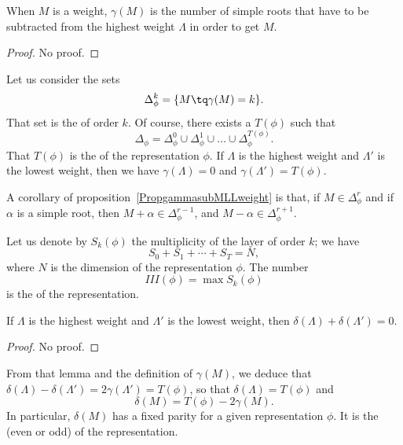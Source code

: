 \begin{proposition}     \label{PropgammasubMLLweight}
When $M$ is a weight, $\gamma(M)$ is the number of simple roots that have to be subtracted from the highest weight $\Lambda$ in order to get $M$.
\end{proposition}
\begin{proof}
    No proof.
\end{proof}

Let us consider the sets
\begin{equation}
    \Delta_{\phi}^k=\{ M\tq\gamma(M)=k \}.
\end{equation}
That set is the  of order $k$. Of course, there exists a $T(\phi)$ such that
\begin{equation}
    \Delta_{\phi}=\Delta_{\phi}^0\cup\Delta_{\phi}^1\cup\ldots\cup\Delta_{\phi}^{T(\phi)}.
\end{equation}
That $T(\phi)$ is the  of the representation $\phi$. If $\Lambda$ is the highest weight and $\Lambda'$ is the lowest weight, then we have $\gamma(\Lambda)=0$ and $\gamma(\Lambda')=T(\phi)$.

A corollary of proposition~\ref{PropgammasubMLLweight} is that, if $M\in\Delta_{\phi}^r$ and if $\alpha$ is a simple root, then $M+\alpha\in\Delta_{\phi}^{r-1}$, and $M-\alpha\in\Delta_{\phi}^{r+1}$.

Let us denote by $S_k(\phi)$ the multiplicity of the layer of order $k$; we have
\begin{equation}
    S_0+S_1+\cdots+S_T=N,
\end{equation}
where $N$ is the dimension of the representation $\phi$. The number
\begin{equation}
    III(\phi)=\max S_k(\phi)
\end{equation}
is the  of the representation.

\begin{lemma}
    If $\Lambda$ is the highest weight and $\Lambda'$ is the lowest weight, then $\delta(\Lambda)+\delta(\Lambda')=0$.
\end{lemma}
\begin{proof}
    No proof.
\end{proof}
From that lemma and the definition of $\gamma(M)$, we deduce that $\delta(\Lambda)-\delta(\Lambda')=2\gamma(\Lambda')=T(\phi)$, so that $\delta(\Lambda)=T(\phi)$ and
\begin{equation}
     \delta(M)=T(\phi)-2\gamma(M).
\end{equation}
In particular, $\delta(M)$ has a fixed parity for a given representation $\phi$. It is the  (even or odd) of the representation.

